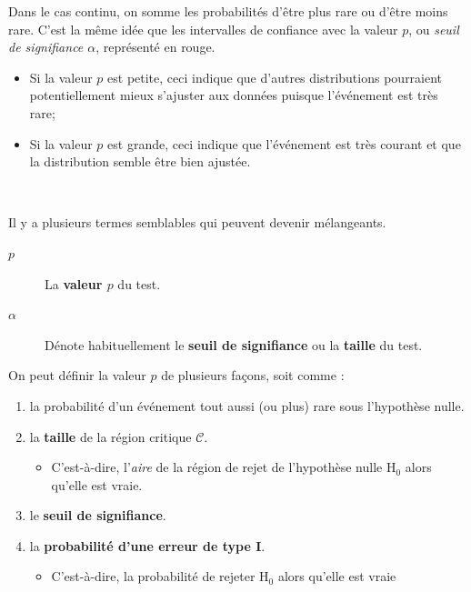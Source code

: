 \documentclass[10pt, french]{article}
\begin{document}
\begin{multicols*}{2}
Dans le cas continu, on somme les probabilités d'être plus rare ou d'être moins rare. C'est la même idée que les intervalles de confiance avec la valeur $p$, ou \textit{seuil de signifiance $\alpha$}, représenté en rouge. 
\begin{itemize}
	\item	Si la valeur $p$ est petite, ceci indique que d'autres distributions pourraient potentiellement mieux s'ajuster aux données puisque l'événement est très rare;
	\item	Si la valeur $p$ est grande, ceci indique que l'événement est très courant et que la distribution semble être bien ajustée.
\end{itemize}

\

Il y a plusieurs termes semblables qui peuvent devenir mélangeants.
\begin{distributions}[Terminologie]
\begin{description}
	\item[$p$]	La \textbf{valeur $p$} du test.
	\item[$\alpha$]	Dénote habituellement le \textbf{seuil de signifiance} ou la \textbf{taille} du test.
\end{description}
\end{distributions}

\begin{definitionNOHFILLsub}
On peut définir la valeur $p$ de plusieurs façons, soit comme : 
\begin{enumerate}
	\item	la probabilité d'un événement tout aussi (ou plus) rare sous l'hypothèse nulle.
	\item	la \textbf{taille} de la région critique $\mathcal{C}$.
		\begin{itemize}
		\item	C'est-à-dire, l'\textit{aire} de la région de rejet de l'hypothèse nulle $\text{H}_{0}$ alors qu'elle est vraie.
		\end{itemize}
	\item	le \textbf{seuil de signifiance}.
	\item	la \textbf{probabilité d'une erreur de type I}.
		\begin{itemize}
		\item	 C'est-à-dire, la probabilité de rejeter $\text{H}_{0}$ alors qu'elle est vraie
		\end{itemize}
\end{enumerate}
\end{definitionNOHFILLsub}


\end{multicols*}
\end{document}
